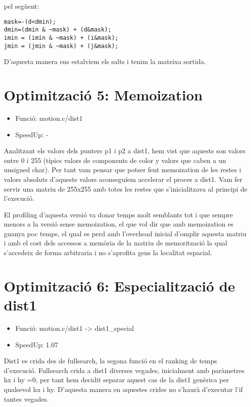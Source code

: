 pel següent:

\begin{lstlisting}
mask=-(d<dmin);
dmin=(dmin & ~mask) + (d&mask);
imin = (imin & ~mask) + (i&mask);
jmin = (jmin & ~mask) + (j&mask);
\end{lstlisting}

D'aquesta manera ens estalviem els salts i tenim la mateixa sortida.

\section{Optimitzaci\'o 5: Memoization}
\begin{itemize}
\item{Funció: motion.c/dist1}
\item{SpeedUp: -}
\end{itemize}

Analitzant els valors dels punters p1 i p2 a dist1, hem vist que aquests son valors entre 0 i 255  (típics valors de components de color y valors que caben a un unsigned char). Per tant vam pensar que potser fent memoization de les restes i valors absoluts d'aquests valors aconseguíem accelerar el proces a dist1. Vam fer servir una matriu de 255x255 amb totes les restes que s'inicialitzava al principi de l'execució. 

El profiling d'aquesta versió va donar temps molt semblants tot i que sempre menors a la versió sense memoization, el que vol dir que amb memoization es guanya poc temps, el qual es perd amb l'overhead inicial d'omplir aquesta matriu i amb el cost dels accessos a memòria de la matriu de memorització la qual s'accedeix de forma arbitraria i no s'aprofita gens la localitat espacial.


\section{Optimitzaci\'o 6: Especialitzaci\'o de dist1}
\begin{itemize}
\item{Funció: motion.c/dist1 -> dist1\_special}
\item{SpeedUp: 1.07}
\end{itemize}

Dist1 es crida des de fullsearch, la segona funció en el ranking de temps d'execució. Fullsearch crida a dist1 diverses vegades, inicialment amb paràmetres hx i hy =0, per tant hem decidit separar aquest cas de la dist1 genèrica per qualsevol hx i hy. D'aquesta manera en aquestes crides no s'haurà d'executar l'if tantes vegades.


